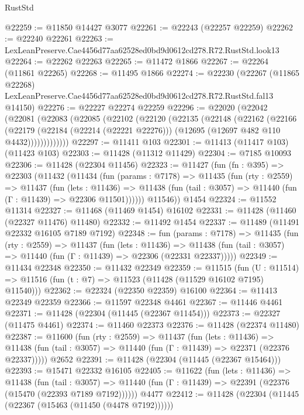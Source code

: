 \begin{lexlean}{RustStd}
\begin{coremodule}
@22259 := @11850 @14427 @3077
@22261 := @22243 (@22257 @22259)
@22262 := @22240 @22261
@22263 := LexLeanPreserve.Cae4456d77aa62528ed0bd9d0612cd278.R72.RustStd.look13
@22264 := @22262 @22263
@22265 := @11472 @1866
@22267 := @22264 (@11861 @22265)
@22268 := @11495 @1866
@22274 := @22230
    (@22267
      (@11865 @22268)
      LexLeanPreserve.Cae4456d77aa62528ed0bd9d0612cd278.R72.RustStd.fal13
      @14150)
@22276 := @22227 @22274 @22259
@22296 := @22020
    (@22042
      (@22081
        (@22083
          (@22085
            (@22102
              (@22120
                (@22135
                  (@22148
                    (@22162
                      (@22166
                        (@22179
                          (@22184 (@22214 (@22221 @22276)))
                          (@12695 (@12697 @482 @110 @4432)))))))))))))
@22297 := @11411 @103
@22301 := @11413 (@11417 @103) (@11423 @103)
@22303 := @11428 (@11312 @11429)
@22304 := @7185 @10093
@22306 := @11428 (@22304 @11456)
@22323 := @11427
    (fun (fn : @395) =>
    @22303
      (@11432
        (@11434
          (fun (params : @7178) =>
          @11435
            (fun (rty : @2559) =>
            @11437
              (fun (lets : @11436) =>
              @11438 (fun (tail : @3057) => @11440 (fun (Γ : @11439) => @22306 @11501))))))
        @11546))
    @1454
@22324 := @11552 @11314
@22327 := @11468 (@11469 @1454) @16102
@22331 := @11428 (@11460 (@22327 @11476) @11480)
@22332 := @11492 @1454
@22337 := @11489 (@11491 @22332 @16105 @7189 @7192)
@22348 := fun (params : @7178) =>
  @11435
    (fun (rty : @2559) =>
    @11437
      (fun (lets : @11436) =>
      @11438 (fun (tail : @3057) => @11440 (fun (Γ : @11439) => @22306 (@22331 @22337)))))
@22349 := @11434 @22348
@22350 := @11432 @22349
@22359 := @11515
    (fun (U : @11514) => @11516 (fun (t : @7) => @11523 (@11428 (@11529 @16102 @7195) @11540)))
@22362 := @22324 (@22350 @22359) @16100
@22364 := @11413 @22349 @22359
@22366 := @11597 @22348 @4461
@22367 := @11446 @4461
@22371 := @11428 (@22304 (@11445 (@22367 @11454)))
@22373 := @22327 (@11475 @4461)
@22374 := @11460 @22373
@22376 := @11428 (@22374 @11480)
@22387 := @11600
    (fun (rty : @2559) =>
    @11437
      (fun (lets : @11436) =>
      @11438 (fun (tail : @3057) => @11440 (fun (Γ : @11439) => @22371 (@22376 @22337)))))
    @2652
@22391 := @11428 (@22304 (@11445 (@22367 @15464)))
@22393 := @15471 @22332 @16105
@22405 := @11622
    (fun (lets : @11436) =>
    @11438
      (fun (tail : @3057) =>
      @11440 (fun (Γ : @11439) => @22391 (@22376 (@15470 (@22393 @7189 @7192))))))
    @4477
@22412 := @11428 (@22304 (@11445 (@22367 (@15463 (@11450 (@4478 @7192))))))

\end{coremodule}
\end{lexlean}
